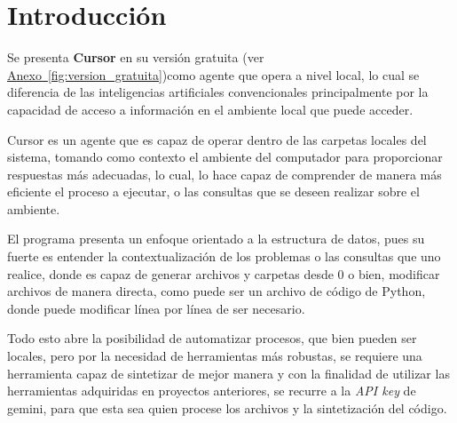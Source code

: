 \documentclass[twocolumn, 11pt, letterpaper]{article}
\begin{document}

\section{Introducción}
Se presenta \textbf{Cursor} en su versión gratuita (ver \hyperref[fig:version_gratuita]{Anexo~\ref*{fig:version_gratuita}})como agente que opera a nivel local, lo cual se diferencia de las inteligencias artificiales convencionales principalmente por la capacidad de acceso a información en el ambiente local que puede acceder.


Cursor es un agente que es capaz de operar dentro de las carpetas locales del sistema, tomando como contexto el ambiente del computador para proporcionar respuestas más adecuadas, lo cual, lo hace capaz de comprender de manera más eficiente el proceso a ejecutar, o las consultas que se deseen realizar sobre el ambiente.

El programa presenta un enfoque orientado a la estructura de datos, pues su fuerte es entender la contextualización de los problemas o las consultas que uno realice, donde es capaz de generar archivos y carpetas desde 0 o bien, modificar archivos de manera directa, como puede ser un archivo de código de Python, donde puede modificar línea por línea de ser necesario.

Todo esto abre la posibilidad de automatizar procesos, que bien pueden ser locales, pero por la necesidad de herramientas más robustas, se requiere una herramienta capaz de sintetizar de mejor manera y con la finalidad de utilizar las herramientas adquiridas en proyectos anteriores, se recurre a la \textit{API key} de gemini, para que esta sea quien procese los archivos y la sintetización del código.
\end{document}
